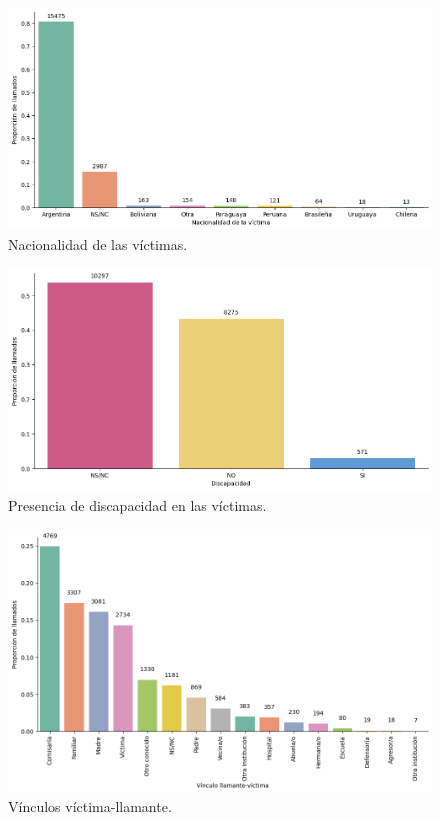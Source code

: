 \documentclass[10 pt]{article}
\begin{document}
\begin{figure}[H]
\begin{center}
\includegraphics[scale=.5]{images/latex_nacionalidad_victima.png}
\caption{Nacionalidad de las víctimas.}
\label{nacionalidad}
\end{center}
\end{figure}



\begin{figure}[H]
\begin{center}
\includegraphics[scale=.5]{images/latex_victima_discapacidad.png}
\caption{Presencia de discapacidad en las víctimas.}
\label{discapacidad}
\end{center}
\end{figure}



\begin{figure}[H]
\begin{center}
\includegraphics[scale=.5]{images/latex_vinculo_llamante.png}
\caption{Vínculos víctima-llamante.}
\label{vinculollamante}
\end{center}
\end{figure}
\end{document}
